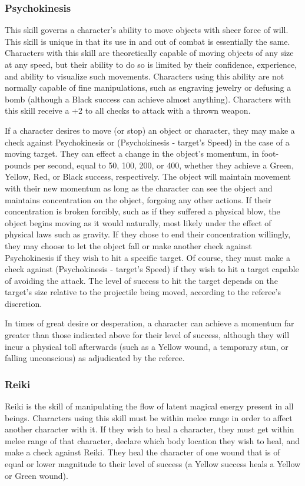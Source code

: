 \documentclass[oneside]{book}
\begin{document}
\begin{multicols}{2}
\subsubsection{Psychokinesis}
This skill governs a character's ability to move objects with sheer force of will. This skill is unique in that its use in and out of combat is essentially the same. Characters with this skill are theoretically capable of moving objects of any size at any speed, but their ability to do so is limited by their confidence, experience, and ability to visualize such movements. Characters using this ability are not normally capable of fine manipulations, such as engraving jewelry or defusing a bomb (although a Black success can achieve almost anything). Characters with this skill receive a +2 to all checks to attack with a thrown weapon. 

If a character desires to move (or stop) an object or character, they may make a check against Psychokinesis or (Psychokinesis - target's Speed) in the case of a moving target. They can effect a change in the object's momentum, in foot-pounds per second, equal to 50, 100, 200, or 400, whether they achieve a Green, Yellow, Red, or Black success, respectively. The object will maintain movement with their new momentum as long as the character can see the object and maintains concentration on the object, forgoing any other actions. If their concentration is broken forcibly, such as if they suffered a physical blow, the object begins moving as it would naturally, most likely under the effect of physical laws such as gravity. If they chose to end their concentration willingly, they may choose to let the object fall or make another check against Psychokinesis if they wish to hit a specific target. Of course, they must make a check against (Psychokinesis - target's Speed) if they wish to hit a target capable of avoiding the attack. The level of success to hit the target depends on the target's size relative to the projectile being moved, according to the referee's discretion. 

In times of great desire or desperation, a character can achieve a momentum far greater than those indicated above for their level of success, although they will incur a physical toll afterwards (such as a Yellow wound, a temporary stun, or falling unconscious) as adjudicated by the referee.

\subsubsection{Reiki}
Reiki is the skill of manipulating the flow of latent magical energy present in all beings. Characters using this skill must be within melee range in order to affect another character with it. If they wish to heal a character, they must get within melee range of that character, declare which body location they wish to heal, and make a check against Reiki. They heal the character of one wound that is of equal or lower magnitude to their level of success (a Yellow success heals a Yellow or Green wound). %


\end{multicols}
\end{document}
